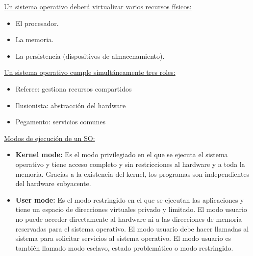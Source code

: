 \documentclass[../main.tex]{subfiles}
\begin{document}
        \underline{Un sistema operativo deberá virtualizar varios recursos físicos:}
        \begin{itemize}
            \item El procesador.
            \item La memoria.
            \item La persistencia (dispositivos de almacenamiento).
        \end{itemize}

        \underline{Un sistema operativo cumple simultáneamente tres roles:}
        \begin{itemize}
            \item Referee: gestiona recursos compartidos
            \item Ilusionista: abstracción del hardware
            \item Pegamento: servicios comunes
        \end{itemize}

        \underline{Modos de ejecución de un SO:}
        \begin{itemize}
            \item \textbf{Kernel mode:}
                Es el modo privilegiado en el que se ejecuta el sistema operativo y tiene acceso completo y sin restricciones al hardware y a toda la memoria.
                Gracias a la existencia del kernel, los programas son independientes del hardware subyacente.
            \item \textbf{User mode:}
                Es el modo restringido en el que se ejecutan las aplicaciones y tiene un espacio de direcciones virtuales privado y limitado. El modo usuario no puede acceder directamente al hardware ni a las direcciones de memoria reservadas para el sistema operativo. El modo usuario debe hacer llamadas al sistema para solicitar servicios al sistema operativo. El modo usuario es también llamado modo esclavo, estado problemático o modo restringido.
        \end{itemize}    
\end{document}
